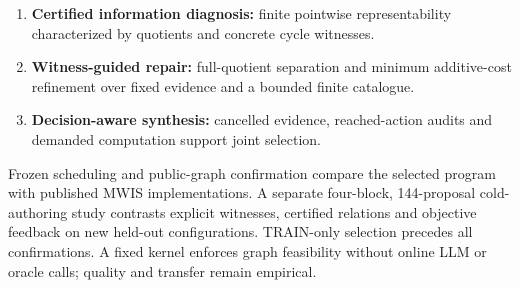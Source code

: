 \begin{enumerate}
\item \textbf{Certified information diagnosis:} finite pointwise
representability characterized by quotients and concrete cycle witnesses.
\item \textbf{Witness-guided repair:} full-quotient separation and minimum
additive-cost refinement over fixed evidence and a bounded finite catalogue.
\item \textbf{Decision-aware synthesis:} cancelled evidence, reached-action
audits and demanded computation support joint selection.
\end{enumerate}

Frozen scheduling and public-graph confirmation compare the selected
program with published MWIS implementations. A separate four-block,
144-proposal cold-authoring study contrasts explicit witnesses, certified
relations and objective feedback on new held-out configurations.
TRAIN-only selection precedes all confirmations. A fixed kernel enforces
graph feasibility without online LLM or oracle calls; quality and transfer
remain empirical.

